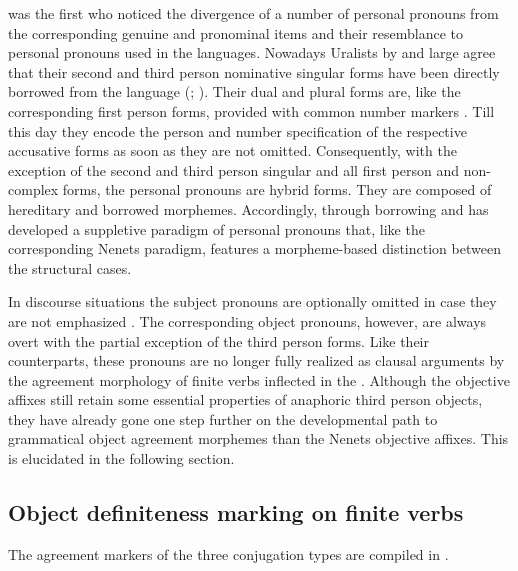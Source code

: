 \documentclass[output=paper]{LSP/langsci}
\begin{document}
\citet[76]{Prokovjev1937Eneckij} was the first who noticed the divergence of a number of  personal pronouns from the corresponding genuine  and  pronominal items and their resemblance to personal pronouns used in the  languages. Nowadays Uralists by and large agree that their second and third person nominative singular forms have been directly borrowed from the  language  (\citealt[456]{Terescenko1966Eneckij}; \citealt[ 119--121]{Siegl2009Personal}). Their dual and plural forms are, like the corresponding first person forms, provided with common  number markers \citep[124--127]{Siegl2009Personal}. Till this day they encode the person and number specification of the respective accusative forms as soon as they are not omitted. Consequently, with the exception of the second and third person singular and all first person and non-complex forms, the  personal pronouns are hybrid forms. They are composed of hereditary  and borrowed  morphemes. Accordingly, through borrowing and   has developed a suppletive paradigm of personal pronouns that, like the corresponding Nenets paradigm, features a morpheme-based distinction between the structural cases. 

In discourse situations the  subject pronouns are optionally omitted in case they are not emphasized \citep[37]{Kunnap1999Enets}. The corresponding object pronouns, however, are always overt with the partial exception of the third person forms. Like their  counterparts, these pronouns are no longer fully realized as clausal arguments by the agreement morphology of finite verbs inflected in the . Although the  objective affixes still retain some essential properties of anaphoric third person objects, they have  already gone one step further on the developmental path to grammatical object agreement morphemes than the Nenets objective affixes. This is elucidated in the following section. 

\subsection{Object definiteness marking on finite verbs}
\label{12-wr-sec:5-3}

The agreement markers of the three  conjugation types are compiled in .
\end{document}
